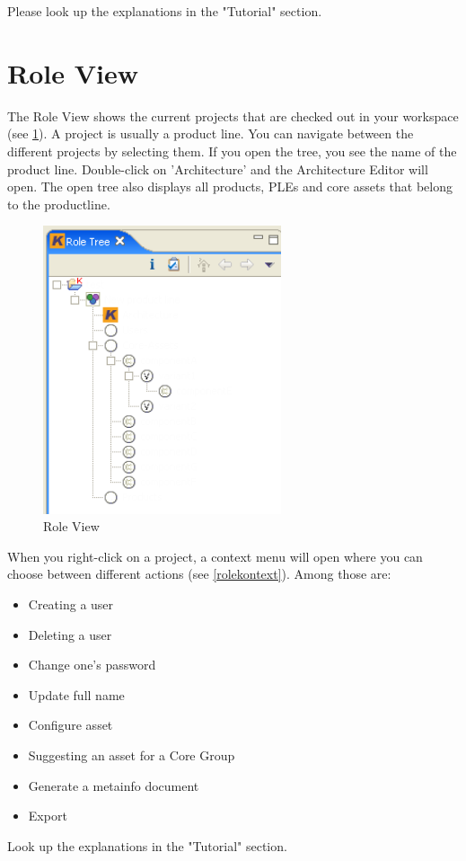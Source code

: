 Please look up the explanations in the "Tutorial" section.

\section{Role View}

The Role View shows the current projects that are checked out in your workspace 
(see \ref{roletree}).
A project is usually a product line. You can navigate between the 
different projects by selecting them. If you open the tree, you see the name
of the product line. Double-click on 'Architecture' and the Architecture Editor will open. The open tree also 
displays all products, PLEs and core assets that belong to the productline.

\begin{figure}[h!]
\begin{center}
\includegraphics[width=7cm]{roletree.png}
   \caption{Role View}
\label{roletree}
\end{center}
\end{figure}\par

When you right-click on a project, a context menu will open where you can choose 
between different actions (see \ref{rolekontext}). Among those are:

\begin{itemize}
	\item Creating a user
	\item Deleting a user
	\item Change one's password
	\item Update full name
	\item Configure asset
	\item Suggesting an asset for a Core Group
	\item Generate a metainfo document
	\item Export
\end{itemize}
Look up the explanations in the "Tutorial" section.

